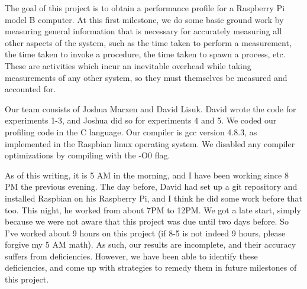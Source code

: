The goal of this project is to obtain a performance profile for a Raspberry Pi model B computer. At this first milestone, we do some basic ground work by measuring general information that is necessary for accurately measuring all other aspects of the system, such as the time taken to perform a measurement, the time taken to invoke a procedure, the time taken to spawn a process, etc. These are activities which incur an inevitable overhead while taking measurements of any other system, so they must themselves be measured and accounted for. 

Our team consists of Joshua Marxen and David Lisuk. David wrote the code for experiments 1-3, and Joshua did so for experiments 4 and 5. We coded our profiling code in the C language. Our compiler is gcc version 4.8.3, as implemented in the Raspbian linux operating system. We disabled any compiler optimizations by compiling with the -O0 flag.

As of this writing, it is 5 AM in the morning, and I have been working since 8 PM the previous evening. The day before, David had set up a git repository and installed Raspbian on his Raspberry Pi, and I think he did some work before that too. This night, he worked from about 7PM to 12PM. We got a late start, simply because we were not aware that this project was due until two days before. So I've worked about 9 hours on this project (if 8-5 is not indeed 9 hours, please forgive my 5 AM math). As such, our results are incomplete, and their accuracy suffers from deficiencies. However, we have been able to identify these deficiencies, and come up with strategies to remedy them in future milestones of this project.